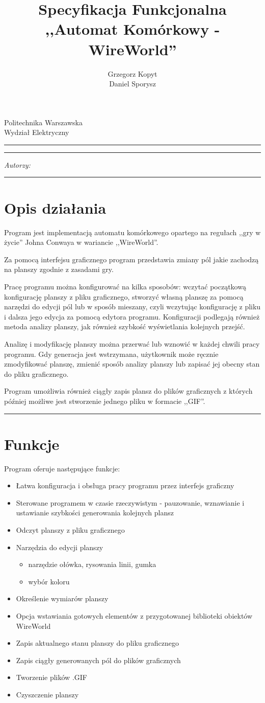 \documentclass[a4paper,11pt]{article}
\author{Grzegorz Kopyt\\
Daniel Sporysz}
\title{Specyfikacja Funkcjonalna \\
,,Automat Komórkowy - WireWorld''}
\makeatletter
\newcommand{\linia}{\rule{\linewidth}{0.4mm}}
\renewcommand{\maketitle}{\begin{titlepage}
    \vspace*{2cm}
    \begin{center}\LARGE
    Politechnika Warszawska\\
    Wydział Elektryczny\\
    \end{center}
    \vspace{5cm}
    \noindent\linia
    \begin{center}
      \LARGE \textsc{\@title}
         \end{center}
     \linia
    \vspace{0.5cm}
    \begin{flushright}
    \begin{minipage}{5cm}
    \textit{Autorzy:}\\
    \normalsize \textsc{\@author} \par
    \end{minipage}
    \vspace{5cm}
     \end{flushright}
    \vspace*{\stretch{6}}
    \begin{center}
    \@date
    \end{center}
  \end{titlepage}%
}
\makeatother
\begin{document}
\maketitle

\tableofcontents
\vspace{1cm}
\noindent\linia
\section{Opis działania}
Program jest implementacją automatu komórkowego opartego na regułach ,,gry w życie'' Johna Conwaya w wariancie ,,WireWorld''.

Za pomocą interfejsu graficznego program przedstawia zmiany pól jakie zachodzą na planszy zgodnie z zasadami gry.

Pracę programu można konfigurować na kilka sposobów: wczytać początkową konfigurację planszy z pliku graficznego, stworzyć własną planszę za pomocą narzędzi do edycji pól lub w sposób mieszany, czyli wczytując konfigurację z pliku i dalsza jego edycja za pomocą edytora programu.
Konfiguracji podlegają również metoda analizy planszy, jak również szybkość wyświetlania kolejnych przejść.

Analizę i modyfikację planszy można przerwać lub wznowić w każdej chwili pracy programu. Gdy generacja jest wstrzymana, użytkownik może ręcznie zmodyfikować planszę, zmienić sposób analizy planszy lub zapisać jej obecny stan do pliku graficznego.

Program umożliwia również ciągły zapis plansz do plików graficznych z których później możliwe jest stworzenie jednego pliku w formacie ,,GIF''.

\noindent\linia
\section{Funkcje}
Program oferuje następujące funkcje:
\begin{itemize}
\item Łatwa konfiguracja i obsługa pracy programu przez interfejs graficzny
\item Sterowane programem w czasie rzeczywistym - pauzowanie, wznawianie i ustawianie szybkości generowania kolejnych plansz
\item Odczyt planszy z pliku graficznego
\item Narzędzia do edycji planszy
\begin{itemize}
\item narzędzie ołówka, rysowania linii, gumka
\item wybór koloru
\end{itemize}
\item Określenie wymiarów planszy
\item Opcja wstawiania gotowych elementów z przygotowanej biblioteki obiektów WireWorld
\item Zapis aktualnego stanu planszy do pliku graficznego
\item Zapis ciągły generowanych pól do plików graficznych
\item Tworzenie plików .GIF
\item Czyszczenie planszy

\end{itemize}
\end{document}
